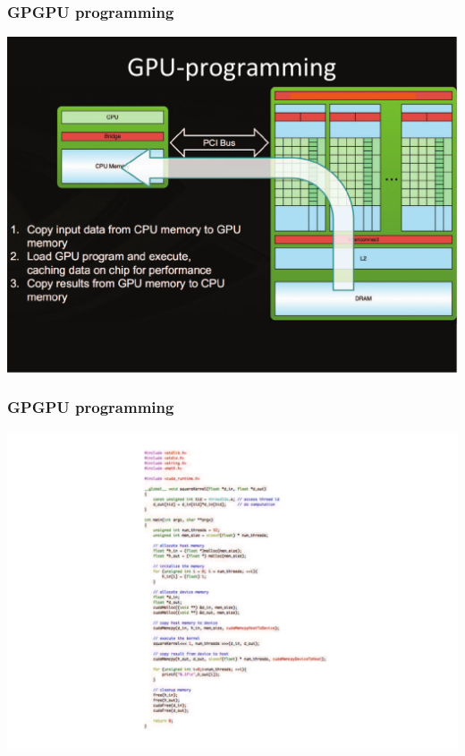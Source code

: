 \documentclass{beamer}
\begin{document}
\begin{frame}[fragile,t]
\frametitle{GPGPU programming}

\begin{center}
\includegraphics[height=43ex]{Figures/Lab1/MemCpy3.pdf}
\end  {center}

\end{frame}


\begin{frame}[fragile,t]
\frametitle{GPGPU programming}

\begin{center}
\includegraphics[height=43ex]{Figures/Lab1/CUDAsimple.pdf}
\end  {center}

\end{frame}
\end{document}
